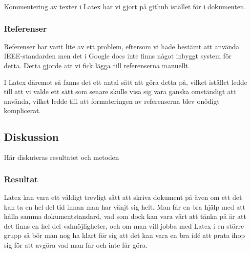 Kommentering av texter i Latex har vi gjort på github istället för i dokumenten.

\subsubsection{Referenser}
Referenser har varit lite av ett problem, eftersom vi hade bestämt att använda IEEE-standarden men det i Google docs inte finns något inbyggt system för detta. Detta gjorde att vi fick lägga till referenserna manuellt.

I Latex däremot så fanns det ett antal sätt att göra detta på, vilket istället ledde till att vi valde ett sätt som senare skulle visa sig vara ganska omständigt att använda, vilket ledde till att formateringen av referenserna blev onödigt komplicerat.

\subsection{Diskussion}
Här diskuteras resultatet och metoden





\subsubsection{Resultat}
Latex kan vara ett väldigt trevligt sätt att skriva dokument på även om ett det kan ta en hel del tid innan man har vänjt sig helt. Man får en bra hjälp med att hålla samma dokumentstandard, vad som dock kan vara värt att tänka på är att det finns en hel del valmöjligheter, och om man vill jobba med Latex i en större grupp så bör man nog ha klart för sig att det kan vara en bra idé att prata ihop sig för att avgöra vad man får och inte får göra.

